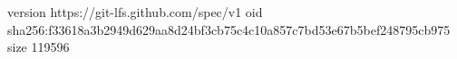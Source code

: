 version https://git-lfs.github.com/spec/v1
oid sha256:f33618a3b2949d629aa8d24bf3cb75c4c10a857c7bd53e67b5bef248795cb975
size 119596
